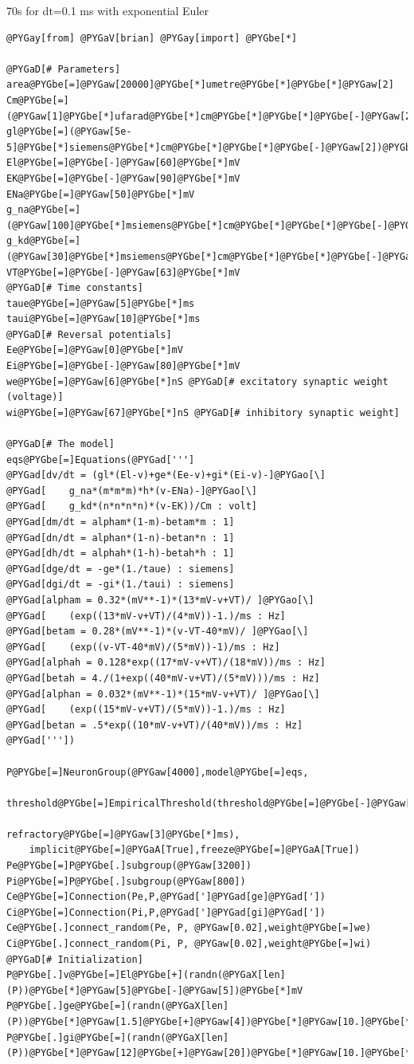 \documentclass[letterpaper,10pt]{manual}
\begin{document}
70s for dt=0.1 ms with exponential Euler

\begin{Verbatim}[commandchars=@\[\]]
@PYGay[from] @PYGaV[brian] @PYGay[import] @PYGbe[*]

@PYGaD[# Parameters]
area@PYGbe[=]@PYGaw[20000]@PYGbe[*]umetre@PYGbe[*]@PYGbe[*]@PYGaw[2]
Cm@PYGbe[=](@PYGaw[1]@PYGbe[*]ufarad@PYGbe[*]cm@PYGbe[*]@PYGbe[*]@PYGbe[-]@PYGaw[2])@PYGbe[*]area
gl@PYGbe[=](@PYGaw[5e-5]@PYGbe[*]siemens@PYGbe[*]cm@PYGbe[*]@PYGbe[*]@PYGbe[-]@PYGaw[2])@PYGbe[*]area
El@PYGbe[=]@PYGbe[-]@PYGaw[60]@PYGbe[*]mV
EK@PYGbe[=]@PYGbe[-]@PYGaw[90]@PYGbe[*]mV
ENa@PYGbe[=]@PYGaw[50]@PYGbe[*]mV
g_na@PYGbe[=](@PYGaw[100]@PYGbe[*]msiemens@PYGbe[*]cm@PYGbe[*]@PYGbe[*]@PYGbe[-]@PYGaw[2])@PYGbe[*]area
g_kd@PYGbe[=](@PYGaw[30]@PYGbe[*]msiemens@PYGbe[*]cm@PYGbe[*]@PYGbe[*]@PYGbe[-]@PYGaw[2])@PYGbe[*]area
VT@PYGbe[=]@PYGbe[-]@PYGaw[63]@PYGbe[*]mV
@PYGaD[# Time constants]
taue@PYGbe[=]@PYGaw[5]@PYGbe[*]ms
taui@PYGbe[=]@PYGaw[10]@PYGbe[*]ms
@PYGaD[# Reversal potentials]
Ee@PYGbe[=]@PYGaw[0]@PYGbe[*]mV
Ei@PYGbe[=]@PYGbe[-]@PYGaw[80]@PYGbe[*]mV
we@PYGbe[=]@PYGaw[6]@PYGbe[*]nS @PYGaD[# excitatory synaptic weight (voltage)]
wi@PYGbe[=]@PYGaw[67]@PYGbe[*]nS @PYGaD[# inhibitory synaptic weight]

@PYGaD[# The model]
eqs@PYGbe[=]Equations(@PYGad[''']
@PYGad[dv/dt = (gl*(El-v)+ge*(Ee-v)+gi*(Ei-v)-]@PYGao[\]
@PYGad[    g_na*(m*m*m)*h*(v-ENa)-]@PYGao[\]
@PYGad[    g_kd*(n*n*n*n)*(v-EK))/Cm : volt]
@PYGad[dm/dt = alpham*(1-m)-betam*m : 1]
@PYGad[dn/dt = alphan*(1-n)-betan*n : 1]
@PYGad[dh/dt = alphah*(1-h)-betah*h : 1]
@PYGad[dge/dt = -ge*(1./taue) : siemens]
@PYGad[dgi/dt = -gi*(1./taui) : siemens]
@PYGad[alpham = 0.32*(mV**-1)*(13*mV-v+VT)/ ]@PYGao[\]
@PYGad[    (exp((13*mV-v+VT)/(4*mV))-1.)/ms : Hz]
@PYGad[betam = 0.28*(mV**-1)*(v-VT-40*mV)/ ]@PYGao[\]
@PYGad[    (exp((v-VT-40*mV)/(5*mV))-1)/ms : Hz]
@PYGad[alphah = 0.128*exp((17*mV-v+VT)/(18*mV))/ms : Hz]
@PYGad[betah = 4./(1+exp((40*mV-v+VT)/(5*mV)))/ms : Hz]
@PYGad[alphan = 0.032*(mV**-1)*(15*mV-v+VT)/ ]@PYGao[\]
@PYGad[    (exp((15*mV-v+VT)/(5*mV))-1.)/ms : Hz]
@PYGad[betan = .5*exp((10*mV-v+VT)/(40*mV))/ms : Hz]
@PYGad['''])

P@PYGbe[=]NeuronGroup(@PYGaw[4000],model@PYGbe[=]eqs,
    threshold@PYGbe[=]EmpiricalThreshold(threshold@PYGbe[=]@PYGbe[-]@PYGaw[20]@PYGbe[*]mV,
                                 refractory@PYGbe[=]@PYGaw[3]@PYGbe[*]ms),
    implicit@PYGbe[=]@PYGaA[True],freeze@PYGbe[=]@PYGaA[True])
Pe@PYGbe[=]P@PYGbe[.]subgroup(@PYGaw[3200])
Pi@PYGbe[=]P@PYGbe[.]subgroup(@PYGaw[800])
Ce@PYGbe[=]Connection(Pe,P,@PYGad[']@PYGad[ge]@PYGad['])
Ci@PYGbe[=]Connection(Pi,P,@PYGad[']@PYGad[gi]@PYGad['])
Ce@PYGbe[.]connect_random(Pe, P, @PYGaw[0.02],weight@PYGbe[=]we)
Ci@PYGbe[.]connect_random(Pi, P, @PYGaw[0.02],weight@PYGbe[=]wi)
@PYGaD[# Initialization]
P@PYGbe[.]v@PYGbe[=]El@PYGbe[+](randn(@PYGaX[len](P))@PYGbe[*]@PYGaw[5]@PYGbe[-]@PYGaw[5])@PYGbe[*]mV
P@PYGbe[.]ge@PYGbe[=](randn(@PYGaX[len](P))@PYGbe[*]@PYGaw[1.5]@PYGbe[+]@PYGaw[4])@PYGbe[*]@PYGaw[10.]@PYGbe[*]nS
P@PYGbe[.]gi@PYGbe[=](randn(@PYGaX[len](P))@PYGbe[*]@PYGaw[12]@PYGbe[+]@PYGaw[20])@PYGbe[*]@PYGaw[10.]@PYGbe[*]nS


\end{Verbatim}
\end{document}
